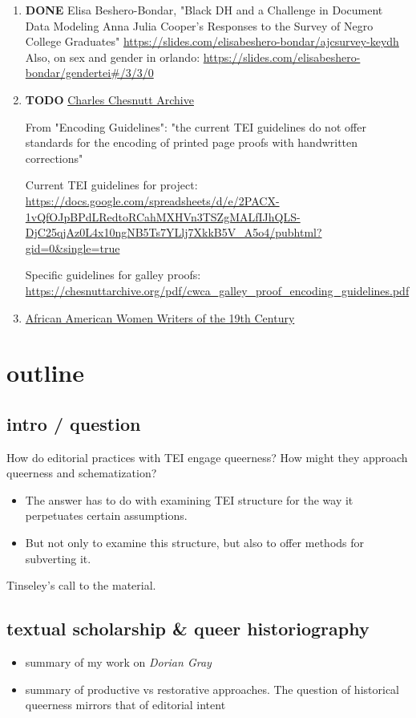 \documentclass[11pt]{article}
\begin{document}
\begin{enumerate}
\item {\bfseries\sffamily DONE} Elisa Beshero-Bondar, "Black DH and a Challenge in Document Data Modeling
\label{sec:org8068d0f}
Anna Julia Cooper's Responses to the Survey of Negro College
Graduates"
\url{https://slides.com/elisabeshero-bondar/ajcsurvey-keydh} 
Also, on sex and gender in orlando:
\url{https://slides.com/elisabeshero-bondar/gendertei\#/3/3/0} 

\item {\bfseries\sffamily TODO} \href{https://chesnuttarchive.org/}{Charles Chesnutt Archive}
\label{sec:org863f498}

From "Encoding Guidelines": "the current TEI guidelines do not offer
standards for the encoding of printed page proofs with handwritten
corrections" 

Current TEI guidelines for project:
\url{https://docs.google.com/spreadsheets/d/e/2PACX-1vQfOJpBPdLRedtoRCahMXHVn3TSZgMALfIJhQLS-DjC25qjAz0L4x10ngNB5Ts7YLlj7XkkB5V\_A5o4/pubhtml?gid=0\&single=true} 

Specific guidelines for galley proofs: 
\url{https://chesnuttarchive.org/pdf/cwca\_galley\_proof\_encoding\_guidelines.pdf} 

\item \href{https://libguides.nypl.org/african-american-women-writers-of-the-19th-Century}{African American Women Writers of the 19th Century}
\label{sec:org6642b4f}
\end{enumerate}


\section{outline}
\label{sec:org13a4ac7}
\subsection{intro / question}
\label{sec:org1b67be4}
How do editorial practices with TEI engage queerness? How might they
approach queerness and schematization?
\begin{itemize}
\item The answer has to do with examining TEI structure for the way it
perpetuates certain assumptions.
\item But not only to examine this structure, but also to offer methods
for subverting it.
\end{itemize}

Tinseley's call to the material. 
\subsection{textual scholarship \& queer historiography}
\label{sec:orgaa6238b}
\begin{itemize}
\item summary of my work on \emph{Dorian Gray}
\item summary of productive vs restorative approaches. The question of
historical queerness mirrors that of editorial intent
\end{itemize}
\end{document}
